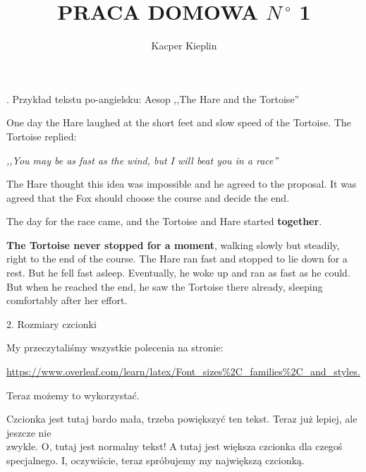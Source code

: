\documentclass[a4paper,11pt]{amsart}
\title{PRACA DOMOWA $N\,^{\circ}\mathrm{}$ 1}
\author{Kacper Kieplin}
\begin{document}
\maketitle
\begin{spacing}{1.4}

. Przykład tekstu po-angielsku: Aesop ,,The Hare and the Tortoise''
\end{spacing}
\begin{spacing}{1.0}
One day the Hare laughed at the short feet and slow speed of the Tortoise. The
Tortoise replied:

\textit{,,You may be as fast as the wind, but I will beat you in a race''}

The Hare thought this idea was impossible and he agreed to the proposal. It
was agreed that the Fox should choose the course and decide the end.

The day for the race came, and the Tortoise and Hare started \textbf{together}.

\textbf{The Tortoise never stopped for a moment}, walking slowly but steadily,
right to the end of the course. The Hare ran fast and stopped to lie down for a rest.
But he fell fast asleep. Eventually, he woke up and ran as fast as he could. But
when he reached the end, he saw the Tortoise there already, sleeping comfortably
after her effort.\\
\end{spacing}
\begin{center}
2. Rozmiary czcionki
\end{center}

My przeczytaliśmy wszystkie polecenia na stronie:

\url{https://www.overleaf.com/learn/latex/Font_sizes%2C_families%2C_and_styles.}

Teraz możemy to wykorzystać.

{\tiny Czcionka jest tutaj bardo mała, trzeba powiększyć ten tekst.} {\small Teraz już lepiej, ale jeszcze nie\\
zwykle.} O, tutaj jest normalny tekst! {\large A tutaj jest większa czcionka dla czegoś\\
specjalnego.} {\Huge I, oczywiście, teraz spróbujemy my
największą czcionką.}
\end{document}
